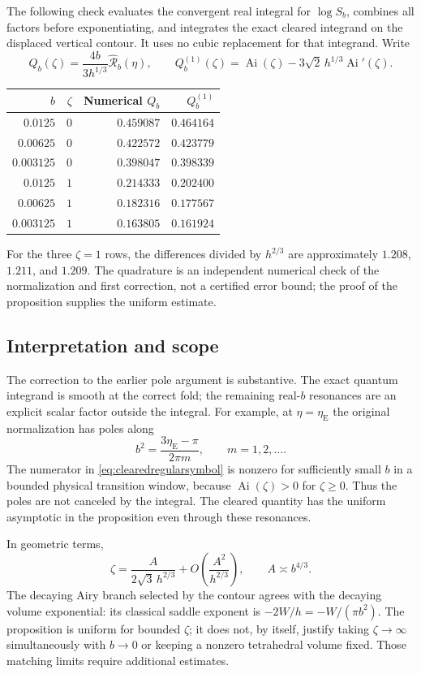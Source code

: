 \documentclass[11pt,a4paper]{article}
\numberwithin{equation}{section}
\theoremstyle{definition}
\theoremstyle{remark}
\begin{document}
The following check evaluates the convergent real integral for
$\log S_b$, combines all factors before exponentiating, and
integrates the exact cleared integrand on the displaced
vertical contour. It uses no cubic replacement for that
integrand. Write
\[
 Q_b(\zeta)=\frac{4b}{3h^{1/3}}\widehat{\mathcal R}_b(\eta),
 \qquad
 Q_b^{(1)}(\zeta)=\operatorname{Ai}(\zeta)
       -3\sqrt2\,h^{1/3}\operatorname{Ai}'(\zeta).
\]
\begin{center}
\begin{tabular}{rrrr}
\toprule
$b$&$\zeta$&Numerical $Q_b$&$Q_b^{(1)}$\\
\midrule
$0.0125$&$0$&$0.459087$&$0.464164$\\
$0.00625$&$0$&$0.422572$&$0.423779$\\
$0.003125$&$0$&$0.398047$&$0.398339$\\
$0.0125$&$1$&$0.214333$&$0.202400$\\
$0.00625$&$1$&$0.182316$&$0.177567$\\
$0.003125$&$1$&$0.163805$&$0.161924$\\
\bottomrule
\end{tabular}
\end{center}
For the three $\zeta=1$ rows, the differences divided by
$h^{2/3}$ are approximately $1.208$, $1.211$, and $1.209$.
The quadrature is an independent numerical check of the
normalization and first correction, not a certified error
bound; the proof of the proposition supplies the uniform estimate.

\subsection{Interpretation and scope}

The correction to the earlier pole argument is substantive.
The exact quantum integrand is smooth at the correct fold;
the remaining real-$b$ resonances are an explicit scalar
factor outside the integral. For example, at $\eta=\eta_{\mathrm E}$
the original normalization has poles along
\[
 b^2=\frac{3\eta_{\mathrm E}-\pi}{2\pi m},
       \qquad m=1,2,\ldots.
\]
The numerator in \eqref{eq:clearedregularsymbol} is nonzero
for sufficiently small $b$ in a bounded physical transition
window, because $\operatorname{Ai}(\zeta)>0$ for
$\zeta\ge0$. Thus the poles are not canceled by the integral.
The cleared quantity has the uniform asymptotic in the
proposition even through these resonances.

In geometric terms,
\[
 \zeta=\frac{A}{2\sqrt3\,h^{2/3}}
          +O\!\left(\frac{A^2}{h^{2/3}}\right),
 \qquad A\asymp b^{4/3}.
\]
The decaying Airy branch selected by the contour agrees with
the decaying volume exponential: its classical saddle
exponent is $-2W/h=-W/(\pi b^2)$.
The proposition is uniform for bounded $\zeta$; it does not,
by itself, justify taking $\zeta\to\infty$ simultaneously
with $b\to0$ or keeping a nonzero tetrahedral volume fixed.
Those matching limits require additional estimates.
\end{document}
